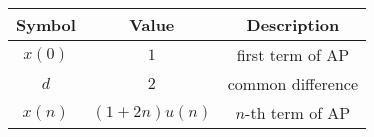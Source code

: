 
\begin{tabular}{|c|c|c|}
	\hline
	\textbf{Symbol} & \textbf{Value} & \textbf{Description} \\[6pt]
	\hline
	$x(0)$ & $1$ & first term of AP \\[6pt]
	\hline
	$d$ & $2$ & common difference \\[6pt]
	\hline
	$x(n)$ & $(1+2n)u(n)$ & $n$-th term of AP \\[6pt]
	\hline
\end{tabular}

